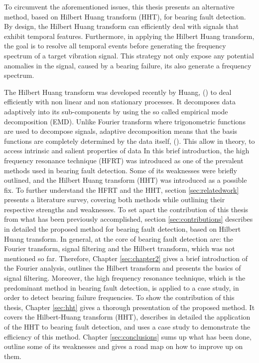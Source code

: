 \documentclass[../Main/thesis.tex]{subfiles}
\begin{document}
To circumvent the aforementioned issues, this thesis presents an alternative method, based on Hilbert Huang transform (HHT), for bearing fault detection. By design, the Hilbert Huang transform can efficiently deal with signals that exhibit temporal features. Furthermore, in applying the Hilbert Huang transform, the goal is to resolve all temporal events before generating the frequency spectrum of a target vibration signal. This strategy not only expose any potential anomalies in the signal, caused by a bearing failure, its also generate a   frequency spectrum.


\justify
The Hilbert Huang transform was developed recently by  Huang, (\cite{huang98}) to deal efficiently with non linear and non stationary processes. It decomposes data adaptively 
into its sub-components by using the so called empirical mode decomposition (EMD). Unlike Fourier transform where trigonometric functions are used to decompose signals, adaptive decomposition means that 
the basis functions are completely determined by the data itself, (\cite{huang08}). This allow in theory, to access intrinsic and salient properties of data
\justify
In this brief introduction, the high frequency resonance technique (HFRT) was introduced as one of the prevalent methods used in bearing fault detection. Some of its weaknesses were  briefly outlined, and the Hilbert Huang transform (HHT) was introduced as a possible fix. To further understand the HFRT and the HHT, section \ref{sec:relatedwork} presents a literature survey, covering both methods while outlining their respective strengths and weaknesses.
To set apart the contribution of this thesis from what has been previously accomplished, section \ref{sec:contributions} describes in detailed the proposed method for bearing fault detection, based on Hilbert Huang transform.
\justify
In general, at the core of bearing fault detection are: the Fourier transform, signal filtering and the Hilbert transform, which was not mentioned so far. Therefore,
 Chapter \ref{sec:chapter2} gives a brief introduction of the Fourier analysis, outlines the Hilbert transform and presents the basics of signal filtering. Moreover, the high frequency resonance technique, which is the predominant method in bearing fault detection, is applied to a case study, in order to detect bearing failure frequencies. To show the contribution of this thesis, Chapter \ref{sec:hht}
gives a thorough presentation of the proposed method. It covers the Hilbert-Huang transform (HHT), describes in detailed the application of the HHT to bearing fault detection, and uses a case study to demonstrate the efficiency of this method. 
 Chapter \ref{sec:conclusions} sums up what has been done, outline some of its weaknesses and gives a road map on how to improve up on them.
\clearpage
\end{document}
